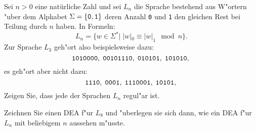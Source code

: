 Sei $n>0$ eine natürliche Zahl und sei $L_n$ die Sprache bestehend
aus W"ortern "uber dem Alphabet
$\Sigma=\{{\tt 0},{\tt 1 }\}$ deren Anzahl {\tt 0} und {\tt 1}
den gleichen Rest bei Teilung durch $n$ haben. In Formeln:
\[
L_n=\{ w\in\Sigma^*| \; |w|_0\equiv |w|_1\mod n\}.
\]
Zur Sprache $L_3$ geh"ort also beispielsweise dazu:
\[
\text{\tt 1010000},\;
\text{\tt 00101110},\;
\text{\tt 010101},\;
\text{\tt 101010},\;
\]
es geh"ort aber nicht dazu:
\[
\text{\tt 1110},\;
\text{\tt 0001},\;
\text{\tt 1110001},\;
\text{\tt 10101},\;
\]
Zeigen Sie, dass jede der Sprachen $L_n$ regul"ar ist.

\begin{hinweis}
Zeichnen Sie einen DEA f"ur $L_8$ und "uberlegen sie
sich dann, wie ein DEA f"ur $L_n$ mit beliebigem $n$ aussehen m"usste.
\end{hinweis}

